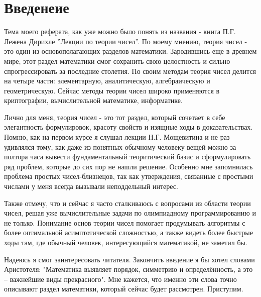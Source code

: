 \chapter{Введенеие}

Тема моего реферата, как уже можно было понять из названия - книга П.Г. Лежена Дирихле ”Лекции по теории чисел”. По моему мнению, теория чисел - это один из основополагающих разделов математики. Зародившись еще в древнем мире, этот раздел математики смог сохранить свою целостность и сильно спрогрессировать за последние столетия. По своим методам теория чисел делится на четыре части: элементарную, аналитическую, алгебраическую и геометрическую. Сейчас методы теории чисел широко применяются в криптографии, вычислительной математике, информатике. 

Лично для меня, теория чисел - это тот раздел, который сочетает в себе элегантность формулировок, красоту свойств и изящные ходы в доказательствах. Помню, как на первом курсе я слушал лекции Н.Г. Мощевитина и не раз удивлялся тому, как даже из понятных обычному человеку вещей можно за полтора часа вывести фундаментальный теоритический базис и сформулировать ряд проблем, которые до сих пор не нашли решение. Особенно мне запомнилась проблема простых чисел-близнецов, так как утверждения, связанные с простыми числами у меня всегда вызывали неподдельный интерес.

Также отмечу, что и сейчас я часто сталкиваюсь с вопросами из области теории чисел, решая уже вычислительные задачи по олимпиадному программированию и не только. Понимание основ теории чисел помогает продумывать алгоритмы с более оптимальной асимптотической сложностью, а также видеть более быстрые ходы там, где обычный человек, интересующийся математикой, не заметил бы. 

Надеюсь я смог заинтересовать читателя. Закончить введение я бы хотел словами Аристотеля: "Математика выявляет порядок, симметрию и определённость, а это – важнейшие виды прекрасного". Мне кажется, что именно эти слова точно описывают раздел математики, который сейчас будет рассмотрен. Приступим.










